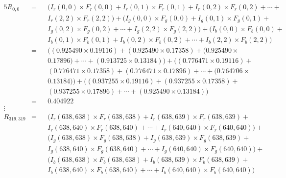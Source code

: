     \begin{alignat*}{5}
        R_{0, 0}        &=  &&\bigl( I_{r}(0, 0)\times F_{r}(0, 0) + I_{r}(0, 1)\times F_{r}(0, 1) + I_{r}(0, 2)\times F_{r}(0, 2) + \cdots + \\
                        &   &&I_{r}(2, 2)\times F_{r}(2, 2) \bigr) + \bigl( I_{g}(0, 0)\times F_{g}(0, 0) + I_{g}(0, 1)\times F_{g}(0, 1) + \\
                        &   &&I_{g}(0, 2)\times F_{g}(0, 2) + \cdots + I_{g}(2, 2)\times F_{g}(2, 2) \bigr) + \bigl( I_{b}(0, 0)\times F_{b}(0, 0) + \\
                        &   &&I_{b}(0, 1)\times F_{b}(0, 1) + I_{b}(0, 2)\times F_{b}(0, 2) + \cdots + I_{b}(2, 2)\times F_{b}(2, 2) \bigr) \\
                        &=  &&\bigl( (0.925490\times 0.19116) + (0.925490\times 0.17358) + (0.925490\times \\
                        &   &&0.17896) + \cdots + (0.913725\times 0.13184) \bigr) + \bigl( (0.776471\times 0.19116) + \\
                        &   &&(0.776471\times 0.17358) + (0.776471\times 0.17896) + \cdots + (0.764706\times \\
                        &   &&0.13184) \bigr) + \bigl( (0.937255\times 0.19116) + (0.937255\times 0.17358) + \\
                        &   &&(0.937255\times 0.17896) + \cdots + (0.925490\times 0.13184) \bigr) \\
                        &=  &&0.404922 \\
        \vdots \\
        R_{319, 319}    &=  &&\bigl( I_{r}(638, 638)\times F_{r}(638, 638) + I_{r}(638, 639)\times F_{r}(638, 639) + \\
                        &   &&I_{r}(638, 640)\times F_{r}(638, 640) + \cdots + I_{r}(640, 640)\times F_{r}(640, 640) \bigr) + \\
                        &   &&\bigl( I_{g}(638, 638)\times F_{g}(638, 638) + I_{g}(638, 639)\times F_{g}(638, 639) + \\
                        &   &&I_{g}(638, 640)\times F_{g}(638, 640) + \cdots + I_{g}(640, 640)\times F_{g}(640, 640) \bigr) + \\
                        &   &&\bigl( I_{b}(638, 638)\times F_{b}(638, 638) + I_{b}(638, 639)\times F_{b}(638, 639) + \\
                        &   &&I_{b}(638, 640)\times F_{b}(638, 640) + \cdots + I_{b}(640, 640)\times F_{b}(640, 640) \bigr) \\

\end{alignat*}
